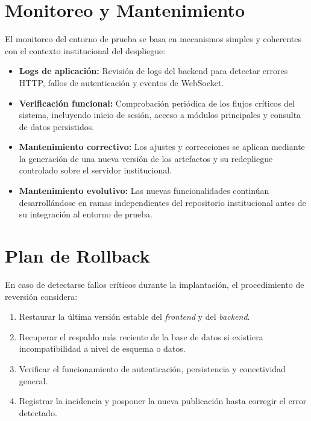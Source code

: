 \section{Monitoreo y Mantenimiento}

El monitoreo del entorno de prueba se basa en mecanismos simples y coherentes con el contexto institucional del despliegue:

\begin{itemize}
    \item \textbf{Logs de aplicación:} Revisión de logs del backend para detectar errores HTTP, fallos de autenticación y eventos de WebSocket.

    \item \textbf{Verificación funcional:} Comprobación periódica de los flujos críticos del sistema, incluyendo inicio de sesión, acceso a módulos principales y consulta de datos persistidos.

    \item \textbf{Mantenimiento correctivo:} Los ajustes y correcciones se aplican mediante la generación de una nueva versión de los artefactos y su redepliegue controlado sobre el servidor institucional.

    \item \textbf{Mantenimiento evolutivo:} Las nuevas funcionalidades continúan desarrollándose en ramas independientes del repositorio institucional antes de su integración al entorno de prueba.
\end{itemize}

\section{Plan de Rollback}

En caso de detectarse fallos críticos durante la implantación, el procedimiento de reversión considera:

\begin{enumerate}
    \item Restaurar la última versión estable del \textit{frontend} y del \textit{backend}.
    \item Recuperar el respaldo más reciente de la base de datos si existiera incompatibilidad a nivel de esquema o datos.
    \item Verificar el funcionamiento de autenticación, persistencia y conectividad general.
    \item Registrar la incidencia y posponer la nueva publicación hasta corregir el error detectado.
\end{enumerate}

